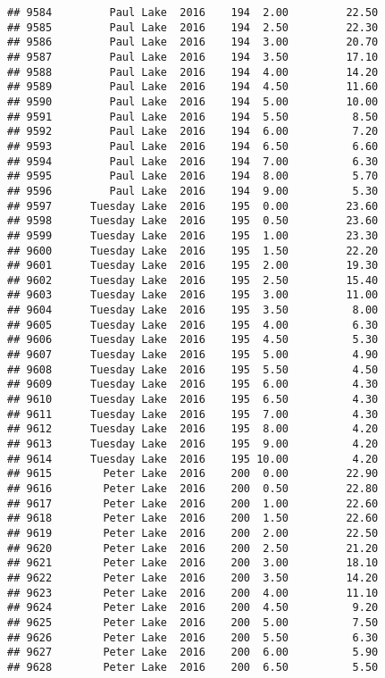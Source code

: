 \documentclass[
]{article}
\begin{document}
\begin{verbatim}
## 9584         Paul Lake  2016    194  2.00         22.50
## 9585         Paul Lake  2016    194  2.50         22.30
## 9586         Paul Lake  2016    194  3.00         20.70
## 9587         Paul Lake  2016    194  3.50         17.10
## 9588         Paul Lake  2016    194  4.00         14.20
## 9589         Paul Lake  2016    194  4.50         11.60
## 9590         Paul Lake  2016    194  5.00         10.00
## 9591         Paul Lake  2016    194  5.50          8.50
## 9592         Paul Lake  2016    194  6.00          7.20
## 9593         Paul Lake  2016    194  6.50          6.60
## 9594         Paul Lake  2016    194  7.00          6.30
## 9595         Paul Lake  2016    194  8.00          5.70
## 9596         Paul Lake  2016    194  9.00          5.30
## 9597      Tuesday Lake  2016    195  0.00         23.60
## 9598      Tuesday Lake  2016    195  0.50         23.60
## 9599      Tuesday Lake  2016    195  1.00         23.30
## 9600      Tuesday Lake  2016    195  1.50         22.20
## 9601      Tuesday Lake  2016    195  2.00         19.30
## 9602      Tuesday Lake  2016    195  2.50         15.40
## 9603      Tuesday Lake  2016    195  3.00         11.00
## 9604      Tuesday Lake  2016    195  3.50          8.00
## 9605      Tuesday Lake  2016    195  4.00          6.30
## 9606      Tuesday Lake  2016    195  4.50          5.30
## 9607      Tuesday Lake  2016    195  5.00          4.90
## 9608      Tuesday Lake  2016    195  5.50          4.50
## 9609      Tuesday Lake  2016    195  6.00          4.30
## 9610      Tuesday Lake  2016    195  6.50          4.30
## 9611      Tuesday Lake  2016    195  7.00          4.30
## 9612      Tuesday Lake  2016    195  8.00          4.20
## 9613      Tuesday Lake  2016    195  9.00          4.20
## 9614      Tuesday Lake  2016    195 10.00          4.20
## 9615        Peter Lake  2016    200  0.00         22.90
## 9616        Peter Lake  2016    200  0.50         22.80
## 9617        Peter Lake  2016    200  1.00         22.60
## 9618        Peter Lake  2016    200  1.50         22.60
## 9619        Peter Lake  2016    200  2.00         22.50
## 9620        Peter Lake  2016    200  2.50         21.20
## 9621        Peter Lake  2016    200  3.00         18.10
## 9622        Peter Lake  2016    200  3.50         14.20
## 9623        Peter Lake  2016    200  4.00         11.10
## 9624        Peter Lake  2016    200  4.50          9.20
## 9625        Peter Lake  2016    200  5.00          7.50
## 9626        Peter Lake  2016    200  5.50          6.30
## 9627        Peter Lake  2016    200  6.00          5.90
## 9628        Peter Lake  2016    200  6.50          5.50

\end{verbatim}
\end{document}
